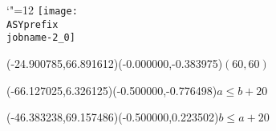 \setlength{\unitlength}{1pt}%
\makeatletter%
\let\ASYencoding\f@encoding%
\let\ASYfamily\f@family%
\let\ASYseries\f@series%
\let\ASYshape\f@shape%
\makeatother%
{\catcode`"=12%
\texttt{[image: \\ASYprefix\\jobname-2\_0]}%
}%
%
\fontsize{6.000000}{7.200000}\selectfont%
\usefont{\ASYencoding}{\ASYfamily}{\ASYseries}{\ASYshape}%
\ASYalign(-24.900785,66.891612)(-0.000000,-0.383975){$(60,60)$}%
%
\fontsize{6.000000}{7.200000}\selectfont%
\ASYalign(-66.127025,6.326125)(-0.500000,-0.776498){$a\le b+20$}%
%
\fontsize{6.000000}{7.200000}\selectfont%
\ASYalign(-46.383238,69.157486)(-0.500000,0.223502){$b\le a+20$}%
